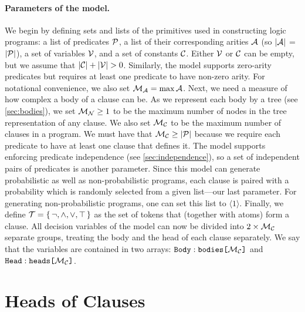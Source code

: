 \paragraph*{Parameters of the model.} We begin by defining sets and lists of the
primitives used in constructing logic programs: a list of predicates
$\predicates{}$, a list of their corresponding arities $\arities{}$ (so
$|\arities{}|$ = $|\predicates{}|$), a set of variables $\variables{}$, and a
set of constants $\constants{}$. Either $\variables{}$ or $\constants{}$ can be
empty, but we assume that $|\constants{}| + |\variables{}| > 0$. Similarly, the
model supports zero-arity predicates but requires at least one predicate to have
non-zero arity. For notational convenience, we also set
$\maxArity{} = \max \arities{}$. Next, we need a measure of how complex a body
of a clause can be. As we represent each body by a tree (see \cref{sec:bodies}),
we set $\maxNumNodes{} \ge 1$ to be the maximum number of nodes in the tree
representation of any clause. We also set $\maxNumClauses{}$ to be the maximum
number of clauses in a program. We must have that
$\maxNumClauses{} \ge |\predicates{}|$ because we require each predicate to have
at least one clause that defines it. The model supports enforcing predicate
independence (see \cref{sec:independence}), so a set of independent pairs of
predicates is another parameter. Since this model can generate probabilistic as
well as non-probabilistic programs, each clause is paired with a probability
which is randomly selected from a given list---our last parameter. For
generating non-probabilistic programs, one can set this list to
$\langle 1 \rangle$. Finally, we define
$\tokens{} = \{\, \neg, \land, \lor, \top \,\}$ as the set of tokens that
(together with atoms) form a clause. All decision variables of the model can now
be divided into $2 \times \maxNumClauses{}$ separate groups, treating the body
and the head of each clause separately. We say that the variables are contained
in two arrays: $\arrayt{bodies}{\maxNumClauses{}}{Body}$ and
$\arrayt{heads}{\maxNumClauses{}}{Head}$.

\section{Heads of Clauses}\label{sec:heads}

